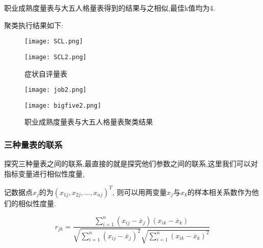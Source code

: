 \documentclass[withoutpreface,bwprint]{cumcmthesis} %
\begin{document}
职业成熟度量表与大五人格量表得到的结果与之相似,最佳k值均为4.

聚类执行结果如下:



\begin{figure}
    \centering
    \begin{minipage}[c]{0.48\textwidth}
        \centering
        \texttt{[image: SCL.png]}
    \end{minipage}
    \begin{minipage}[c]{0.48\textwidth}
        \centering
        \texttt{[image: SCL2.png]}
    \end{minipage}
    \caption{症状自评量表}
\end{figure}


\begin{figure}
    \centering
    \begin{minipage}[c]{0.48\textwidth}
        \centering
        \texttt{[image: job2.png]}
    \end{minipage}
    \begin{minipage}[c]{0.48\textwidth}
        \centering
        \texttt{[image: bigfive2.png]}
    \end{minipage}
    \caption{职业成熟度量表与大五人格量表聚类结果}
\end{figure}

\subsubsection{三种量表的联系}

探究三种量表之间的联系,最直接的就是探究他们参数之间的联系,这里我们可以对指标变量进行相似性度量,

记数据点$x_j$的为$(x_{1j}, x_{2j}, ... , x_{nj})^T$, 则可以用两变量$x_j$与$x_k$的样本相关系数作为他们的相似性度量.

\begin{equation}
r_{jk} = \frac{\sum_{i=1}^n (x_{ij} - \overline{x}_j)(x_{ik} - \overline{x}_k)}{\sqrt{\sum_{i=1}^n (x_{ij} - \overline{x}_j)^2} \sqrt{\sum_{i=1}^n (x_{ik} - \overline{x}_k)^2}}
\end{equation}
\end{document}
